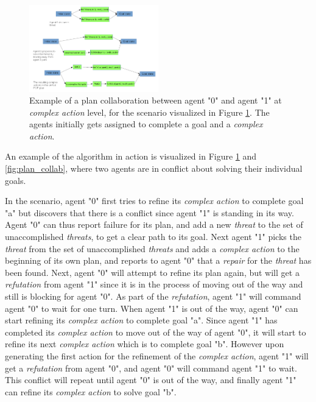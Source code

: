\documentclass[Main]{subfiles}
\begin{document}
\begin{figure}[h!]
	\centering
	\includegraphics[width=0.5\textwidth]{unhtnpop.png}
	\caption{Example of a plan collaboration between agent "0" and agent "1" at \textit{complex action} level, for the scenario visualized in Figure \ref{fig:htn_collab}. The agents initially gets assigned to complete a goal and a \textit{complex action}.}
	\label{fig:htn_collab}
\end{figure}

An example of the algorithm in action is visualized in Figure \ref{fig:htn_collab} and \ref{fig:plan_collab}, where two agents are in conflict about solving their individual goals.

In the scenario, agent "0" first tries to refine its \textit{complex action} to complete goal "a" but discovers that there is a conflict since agent "1" is standing in its way.
Agent "0" can thus report failure for its plan, and add a new \textit{threat} to the set of unaccomplished \textit{threats}, to get a clear path to its goal.
Next agent "1" picks the \textit{threat} from the set of unaccomplished \textit{threats} and adds a \textit{complex action} to the beginning of its own plan, and reports to agent "0" that a \textit{repair} for the \textit{threat} has been found.
Next, agent "0" will attempt to refine its plan again, but will get a \textit{refutation} from agent "1" since it is in the process of moving out of the way and still is blocking for agent "0".
As part of the \textit{refutation}, agent "1" will command agent "0" to wait for one turn.
When agent "1" is out of the way, agent "0" can start refining its \textit{complex action} to complete goal "a".
Since agent "1" has completed its \textit{complex action} to move out of the way of agent "0", it will start to refine its next \textit{complex action} which is to complete goal "b".
However upon generating the first action for the refinement of the \textit{complex action}, agent "1" will get a \textit{refutation} from agent "0", and agent "0" will command agent "1" to wait.
This conflict will repeat until agent "0" is out of the way, and finally agent "1" can refine its \textit{complex action} to solve goal "b".




\end{document}
